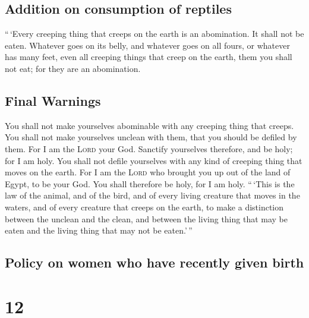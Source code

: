 \hypertarget{addition-on-consumption-of-reptiles}{%
\subsection{Addition on consumption of
reptiles}\label{addition-on-consumption-of-reptiles}}

 ``\,`Every creeping thing that creeps on the earth is an
abomination. It shall not be eaten.  Whatever goes on its
belly, and whatever goes on all fours, or whatever has many feet, even
all creeping things that creep on the earth, them you shall not eat; for
they are an abomination.

\hypertarget{final-warnings}{%
\subsection{Final Warnings}\label{final-warnings}}

 You shall not make yourselves abominable with any
creeping thing that creeps. You shall not make yourselves unclean with
them, that you should be defiled by them.  For I am the
\textsc{Lord} your God. Sanctify yourselves therefore, and be holy; for
I am holy. You shall not defile yourselves with any kind of creeping
thing that moves on the earth.  For I am the
\textsc{Lord} who brought you up out of the land of Egypt, to be your
God. You shall therefore be holy, for I am holy. 
``\,`This is the law of the animal, and of the bird, and of every living
creature that moves in the waters, and of every creature that creeps on
the earth,  to make a distinction between the unclean and
the clean, and between the living thing that may be eaten and the living
thing that may not be eaten.'\,''

\hypertarget{policy-on-women-who-have-recently-given-birth}{%
\subsection{Policy on women who have recently given
birth}\label{policy-on-women-who-have-recently-given-birth}}

\hypertarget{section-11}{%
\section{12}\label{section-11}}

